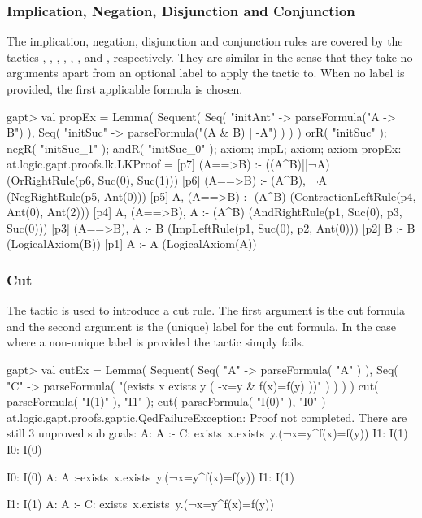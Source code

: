 \documentclass{article}
\newcommand{\cli}[1]{{\ttfamily {#1}}}
\begin{document}
\subsubsection*{Implication, Negation, Disjunction and Conjunction}
The implication, negation, disjunction and conjunction rules are covered by the tactics \cli{impL}, \cli{impR}, \cli{negL}, \cli{negR}, \cli{disL}, \cli{disR}, \cli{conL} and \cli{conR}, respectively. They are similar in the sense that they take no arguments apart from an optional label to apply the tactic to. When no label is provided, the first applicable formula is chosen.

\begin{clilisting}
gapt> val propEx = Lemma( Sequent( Seq( "initAnt" -> parseFormula("A -> B") ), Seq( "initSuc" -> parseFormula("(A & B) | -A") ) ) ) { orR( "initSuc" ); negR( "initSuc_1" ); andR( "initSuc_0" ); axiom; impL; axiom; axiom }
propEx: at.logic.gapt.proofs.lk.LKProof =
[p7] (A==>B) :- ((A^B)||¬A)    (OrRightRule(p6, Suc(0), Suc(1)))
[p6] (A==>B) :- (A^B), ¬A    (NegRightRule(p5, Ant(0)))
[p5] A, (A==>B) :- (A^B)    (ContractionLeftRule(p4, Ant(0), Ant(2)))
[p4] A, (A==>B), A :- (A^B)    (AndRightRule(p1, Suc(0), p3, Suc(0)))
[p3] (A==>B), A :- B    (ImpLeftRule(p1, Suc(0), p2, Ant(0)))
[p2] B :- B    (LogicalAxiom(B))
[p1] A :- A    (LogicalAxiom(A))
\end{clilisting} 

\subsubsection*{Cut}

The \cli{cut} tactic is used to introduce a cut rule. The first argument is the cut formula and the second argument is the (unique) label for the cut formula. In the case where a non-unique label is provided the tactic simply fails.

\begin{clilisting}
gapt> val cutEx = Lemma( Sequent( Seq( "A" -> parseFormula( "A" ) ), Seq( "C" -> parseFormula( "(exists x exists y ( -x=y & f(x)=f(y) ))" ) ) ) ) { cut( parseFormula( "I(1)" ), "I1" ); cut( parseFormula( "I(0)" ), "I0" ) }
at.logic.gapt.proofs.gaptic.QedFailureException: Proof not completed. There are still 3 unproved sub goals:
A: A
:-
C: exists~x.exists~y.(¬x=y^f(x)=f(y))
I1: I(1)
I0: I(0)

I0: I(0)
A: A
:-exists~x.exists~y.(¬x=y^f(x)=f(y))
I1: I(1)

I1: I(1)
A: A
:-
C: exists~x.exists~y.(¬x=y^f(x)=f(y))
\end{clilisting}
\end{document}
